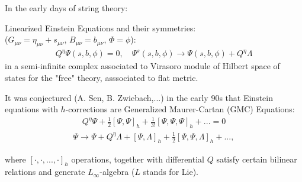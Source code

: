 \documentclass[9pt]{beamer}
\begin{document}
\begin{frame}
\frametitle{}
In the early days of string theory:\\

\vspace*{3mm}

Linearized Einstein Equations and their symmetries:\\ 
($G_{\mu\nu}=\eta_{\mu\nu}+s_{\mu\nu}$, $B_{\mu\nu}=b_{\mu\nu}$, $\Phi=\phi$):
\begin{eqnarray*}
Q^{\eta}\Psi(s, b, \phi)=0, \quad \Psi^s(s, b, \phi)\to \Psi(s, b, \phi)+Q^{\eta}\Lambda
\end{eqnarray*}
in a semi-infinite complex associated to Virasoro module of Hilbert space of states for the "free" theory, asssociated to flat metric. \\

\vspace*{3mm}

It was conjectured (A. Sen, B. Zwiebach,...) in the early 90s that Einstein equations with $h$-corrections are Generalized Maurer-Cartan (GMC) Equations:
\begin{eqnarray*}
Q^{\eta}\Psi+
\frac{1}{2}[\Psi, \Psi]_h+\frac{1}{3!}[\Psi, \Psi, \Psi]_h+...=0
\end{eqnarray*}
\begin{eqnarray*}
\Psi\to \Psi+Q^{\eta}\Lambda+[\Psi,\Lambda]_h+\frac{1}{2}[\Psi,\Psi,\Lambda]_h+...,
\end{eqnarray*}

where $[\cdot, \cdot, ..., \cdot]_h$ operations, together with differential 
$Q$ satisfy certain bilinear relations and generate $L_{\infty}$-algebra ($L$ stands for Lie).
\end{frame}
\end{document}
